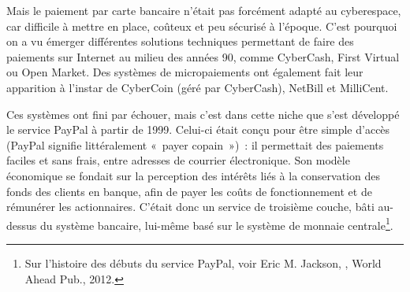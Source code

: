 Mais le paiement par carte bancaire n'était pas forcément adapté au cyberespace, car difficile à mettre en place, coûteux et peu sécurisé à l'époque. C'est pourquoi on a vu émerger différentes solutions techniques permettant de faire des paiements sur Internet au milieu des années 90, comme CyberCash, First Virtual ou Open Market. Des systèmes de micropaiements ont également fait leur apparition à l'instar de CyberCoin (géré par CyberCash), NetBill et MilliCent.


Ces systèmes ont fini par échouer, mais c'est dans cette niche que s'est développé le service PayPal à partir de 1999. Celui-ci était conçu pour être simple d'accès (PayPal signifie littéralement «~payer copain~»)~: il permettait des paiements faciles et sans frais, entre adresses de courrier électronique. Son modèle économique se fondait sur la perception des intérêts liés à la  conservation des fonds des clients en banque, afin de payer les coûts de fonctionnement et de rémunérer les actionnaires. C'était donc un service de troisième couche, bâti au-dessus du système bancaire, lui-même basé sur le système de monnaie centrale\footnote{Sur l'histoire des débuts du service PayPal, voir Eric M. Jackson, , World Ahead Pub., 2012.}.

